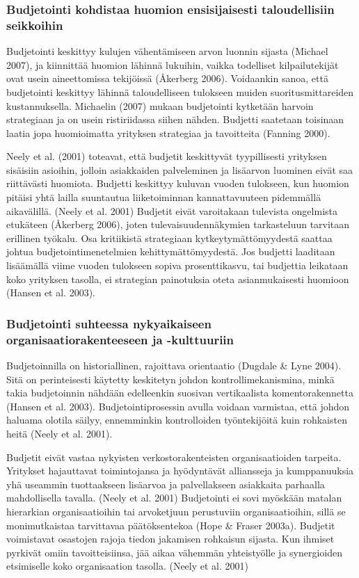 \documentclass[12pt,a4paper,oneside,pdftex]{report}
\begin{document}
\subsubsection{Budjetointi kohdistaa huomion ensisijaisesti taloudellisiin seikkoihin}

Budjetointi keskittyy kulujen vähentämiseen arvon luonnin sijasta (Michael 2007), ja kiinnittää huomion lähinnä lukuihin, vaikka todelliset kilpailutekijät ovat usein aineettomissa tekijöissä (Åkerberg 2006). Voidaankin sanoa, että budjetointi keskittyy lähinnä taloudelliseen tulokseen muiden suoritusmittareiden kustannuksella. Michaelin (2007) mukaan budjetointi kytketään harvoin strategiaan ja on usein ristiriidassa siihen nähden. Budjetti saatetaan toisinaan laatia jopa huomioimatta yrityksen strategiaa ja tavoitteita (Fanning 2000).

Neely et al. (2001) toteavat, että budjetit keskittyvät tyypillisesti yrityksen sisäisiin asioihin, jolloin asiakkaiden palveleminen ja lisäarvon luominen eivät saa riittävästi huomiota. Budjetti keskittyy kuluvan vuoden tulokseen, kun huomion pitäisi yhtä lailla suuntautua liiketoiminnan kannattavuuteen pidemmällä aikavälillä. (Neely et al. 2001) Budjetit eivät varoitakaan tulevista ongelmista etukäteen (Åkerberg 2006), joten tulevaisuudennäkymien tarkasteluun tarvitaan erillinen työkalu. Osa kritiikistä strategiaan kytkeytymättömyydestä saattaa johtua budjetointimenetelmien kehittymättömyydestä. Jos budjetti laaditaan lisäämällä viime vuoden tulokseen sopiva prosenttikasvu, tai budjettia leikataan koko yrityksen tasolla, ei strategian painotuksia oteta asianmukaisesti huomioon (Hansen et al. 2003).

\subsubsection{Budjetointi suhteessa nykyaikaiseen organisaatiorakenteeseen ja -kulttuuriin}

Budjetoinnilla on historiallinen, rajoittava orientaatio (Dugdale & Lyne 2004). Sitä on perinteisesti käytetty keskitetyn johdon kontrollimekanismina, minkä takia budjetoinnin nähdään edelleenkin suosivan vertikaalista komentorakennetta (Hansen et al. 2003). Budjetointiprosessin avulla voidaan varmistaa, että johdon haluama olotila säilyy, ennemminkin kontrolloiden työntekijöitä kuin rohkaisten heitä (Neely et al. 2001).

Budjetit eivät vastaa nykyisten verkostorakenteisten organisaatioiden tarpeita. Yritykset hajauttavat toimintojansa ja hyödyntävät alliansseja ja kumppanuuksia yhä useammin tuottaakseen lisäarvoa ja palvellakseen asiakkaita parhaalla mahdollisella tavalla. (Neely et al. 2001) Budjetointi ei sovi myöskään matalan hierarkian organisaatioihin tai arvoketjuun perustuviin organisaatioihin, sillä se monimutkaistaa tarvittavaa päätöksentekoa (Hope & Fraser 2003a). Budjetit voimistavat osastojen rajoja tiedon jakamisen rohkaisun sijasta. Kun ihmiset pyrkivät omiin tavoitteisiinsa, jää aikaa vähemmän yhteistyölle ja synergioiden etsimiselle koko organisaation tasolla. (Neely et al. 2001)
\end{document}
